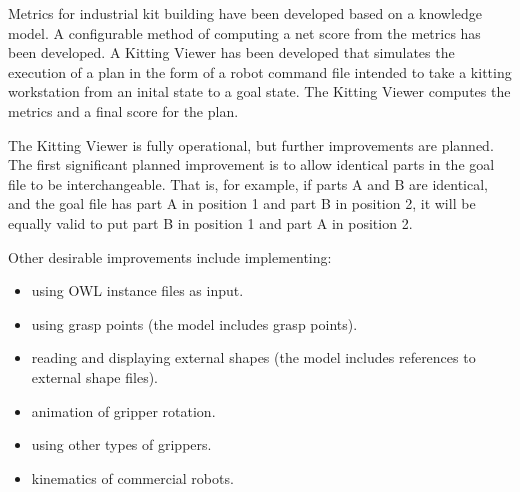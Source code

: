 Metrics for industrial kit building have been developed based on a
knowledge model. A configurable method of computing a net score from the
metrics has been developed. A Kitting Viewer has been developed that
simulates the execution of a plan in the form of a robot command file
intended to take a kitting workstation from an inital state to a goal
state. The Kitting Viewer computes the metrics and a final score for the
plan.

The Kitting Viewer is fully operational, but further improvements are
planned. The first significant planned improvement is to allow identical
parts in the goal file to be interchangeable. That is, for example, if
parts A and B are identical, and the goal file has part A in position 1 and
part B in position 2, it will be equally valid to put part B in position 1
and part A in position 2.

Other desirable improvements include implementing:

\begin{itemize}

\item using OWL instance files as input.

\item using grasp points (the model includes grasp points).

\item reading and displaying external shapes (the model includes references
  to external shape files).

\item animation of gripper rotation.

\item using other types of grippers.

\item kinematics of commercial robots.

\end{itemize}
